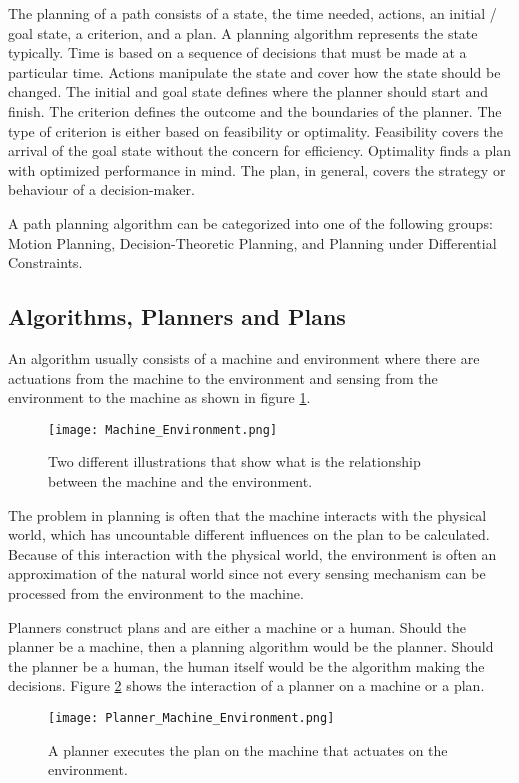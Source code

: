 The planning of a path consists of a state, the time needed, actions, an initial / goal state, a criterion, and a plan. A planning algorithm represents the state typically. Time is based on a sequence of decisions that must be made at a particular time. Actions manipulate the state and cover how the state should be changed. The initial and goal state defines where the planner should start and finish.
The criterion defines the outcome and the boundaries of the planner. The type of criterion is either based on feasibility or optimality. Feasibility covers the arrival of the goal state without the concern for efficiency. Optimality finds a plan with optimized performance in mind. The plan, in general, covers the strategy or behaviour of a decision-maker. \cite{planning_algorithms_steven_m_lavalle}

A path planning algorithm can be categorized into one of the following groups: Motion Planning, Decision-Theoretic Planning, and Planning under Differential Constraints.
\cite{planning_algorithms_steven_m_lavalle}

\subsection{Algorithms, Planners and Plans} \label{sec:Algorithms, Planners and Plans}
An algorithm usually consists of a machine and environment where there are actuations from the machine to the environment and sensing from the environment to the machine as shown in figure \ref{fig:Machine and Environment interaction}.
\begin{figure}[H]
    \centering
    \texttt{[image: Machine\_Environment.png]}
    \caption{Two different illustrations that show what is the relationship between the machine and the environment. \cite{planning_algorithms_steven_m_lavalle}}
    \label{fig:Machine and Environment interaction}
\end{figure}
The problem in planning is often that the machine interacts with the physical world, which has uncountable different influences on the plan to be calculated. Because of this interaction with the physical world, the environment is often an approximation of the natural world since not every sensing mechanism can be processed from the environment to the machine.

Planners construct plans and are either a machine or a human. Should the planner be a machine, then a planning algorithm would be the planner. Should the planner be a human, the human itself would be the algorithm making the decisions. Figure \ref{fig:Planner Machine Environment} shows the interaction of a planner on a machine or a plan.
\begin{figure}[H]
    \centering
    \texttt{[image: Planner\_Machine\_Environment.png]}
    \caption{A planner executes the plan on the machine that actuates on the environment. \cite{planning_algorithms_steven_m_lavalle}}
    \label{fig:Planner Machine Environment}
\end{figure}

